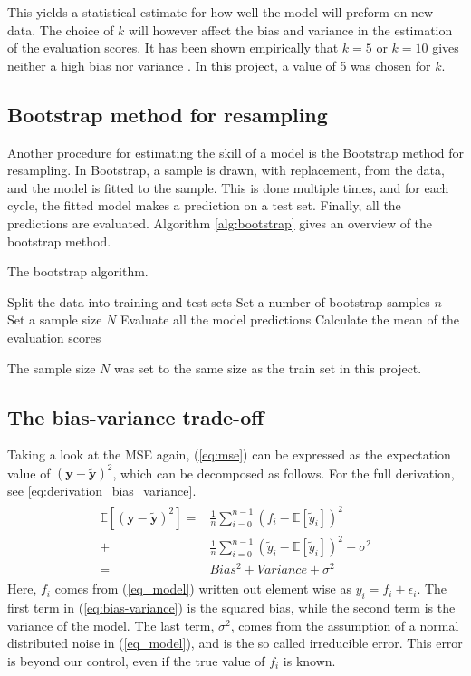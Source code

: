 This yields a statistical estimate for how well the model will preform on new data. The choice of $k$ will however affect the bias and variance in the estimation of the evaluation scores. It has been shown empirically that $k=5$ or $k=10$ gives neither a high bias nor variance \citep{james2013introduction}. In this project, a value of 5 was chosen for $k$.

\subsection{Bootstrap method for resampling}
Another procedure for estimating the skill of a model is the Bootstrap method for resampling. In Bootstrap, a sample is drawn, with replacement, from the data, and the model is fitted to the sample. This is done multiple times, and for each cycle, the fitted model makes a prediction on a test set. Finally, all the predictions are evaluated. Algorithm \ref{alg:bootstrap} gives an overview of the bootstrap method.
\begin{algorithm}[htbp]\caption{The bootstrap algorithm.}\label{alg:bootstrap}
	\SetAlgoLined
	\BlankLine
	\BlankLine
	Split the data into training and test sets\;
	Set a number of bootstrap samples $n$\;
	Set a sample size $N$\;
	Evaluate all the model predictions\;
	Calculate the mean of the evaluation scores\;
	\BlankLine
	\BlankLine
\end{algorithm}

The sample size $N$ was set to the same size as the train set in this project. 

\subsection{The bias-variance trade-off}
Taking a look at the MSE again, (\ref{eq:mse}) can be expressed as the expectation value of $\left(\boldsymbol{y}-\boldsymbol{\tilde{y}}\right)^2$, which can be decomposed as follows. For the full derivation, see \eqref{eq:derivation_bias_variance}.
\begin{align}\label{eq:bias-variance}
\begin{split}
	\mathds{E}\left[\left(\boldsymbol{y}-\boldsymbol{\tilde{y}}\right)^2\right]
	=&\frac{1}{n}\sum_{i=0}^{n-1}\left(f_i-\mathds{E}\left[{\tilde{y}_i}\right]\right)^2 \\
	+&\frac{1}{n}\sum_{i=0}^{n-1}\left(\tilde{y}_i-\mathds{E}\left[{\tilde{y}_i}\right]\right)^2 + \sigma^2 \\
	=& Bias^2 + Variance + \sigma^2
\end{split}
\end{align}
Here, $f_i$ comes from (\ref{eq_model}) written out element wise as $y_i = f_i + \epsilon_i$. The first term in (\ref{eq:bias-variance}) is the squared bias, while the second term is the variance of the model. The last term, $\sigma^2$, comes from the assumption of a normal distributed noise in (\ref{eq_model}), and is the so called irreducible error. This error is beyond our control, even if the true value of $f_i$ is known.

